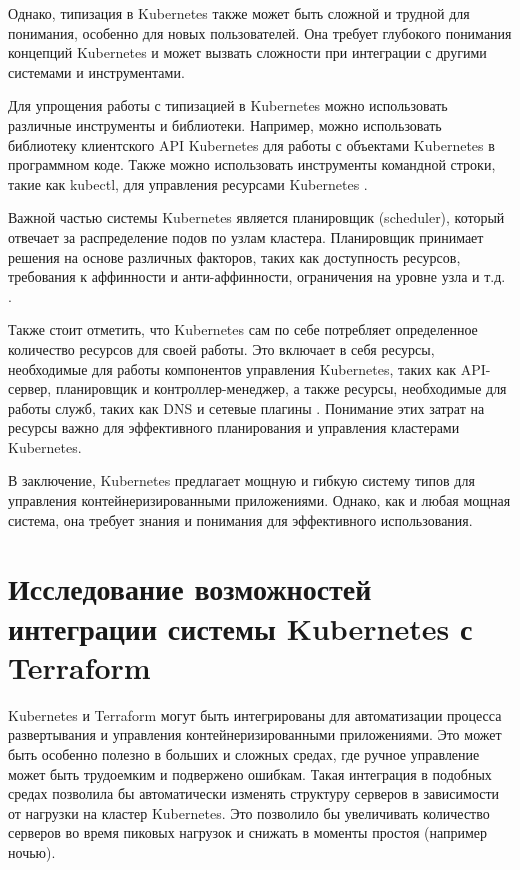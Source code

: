 Однако, типизация в Kubernetes также может быть сложной и трудной для
понимания, особенно для новых пользователей. Она требует глубокого
понимания концепций Kubernetes и может вызвать сложности при интеграции
с другими системами и инструментами.

Для упрощения работы с типизацией в Kubernetes можно использовать
различные инструменты и библиотеки. Например, можно использовать
библиотеку клиентского API \newline Kubernetes для работы с объектами Kubernetes
в программном коде. Также можно использовать инструменты командной строки,
такие как kubectl, для управления ресурсами Kubernetes \cite{kubectl}.

Важной частью системы Kubernetes является планировщик (scheduler),
который отвечает за распределение подов по узлам кластера. Планировщик
принимает решения на основе различных факторов, таких как доступность
ресурсов, требования к аффинности и анти-аффинности, ограничения на уровне
узла и т.д. \cite{carrion2022kubernetes}.

Также стоит отметить, что Kubernetes сам по себе потребляет определенное
количество ресурсов для своей работы. Это включает в себя ресурсы,
необходимые для работы компонентов управления Kubernetes, таких как
API-сервер, планировщик и контроллер-менеджер, а также ресурсы, необходимые
для работы служб, таких как DNS и сетевые плагины \cite{turin2023predicting}.
Понимание этих затрат на ресурсы важно для эффективного планирования и
управления кластерами Kubernetes.

В заключение, Kubernetes предлагает мощную и гибкую систему типов для
управления контейнеризированными приложениями. Однако, как и любая мощная
система, она требует знания и понимания для эффективного использования.

\section{Исследование возможностей интеграции системы Kubernetes с \newline
Terraform}
Kubernetes и Terraform могут быть интегрированы для автоматизации процесса
развертывания и управления контейнеризированными приложениями.
Это может быть особенно полезно в больших и сложных средах, где ручное
управление может быть трудоемким и подвержено ошибкам.
Такая интеграция в подобных средах позволила бы автоматически изменять
структуру серверов в зависимости от нагрузки на кластер Kubernetes. 
Это позволило бы увеличивать количество серверов во время пиковых нагрузок
и снижать в моменты простоя (например ночью).

